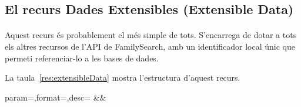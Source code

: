 \subsection{El recurs Dades Extensibles (Extensible Data)}

    \paragraph{}
    Aquest recurs és probablement el més simple de tots. S'encarrega de dotar a tots els altres recursos de l'API de FamilySearch, amb un identificador local únic que permeti referenciar-lo a les bases de dades.

    La taula~\ref{res:extensibleData} mostra l'estructura d'aquest recurs.

    \begin{center}
             {param=\param,format=\format,desc=\desc}
             {\param&\format&\desc}
     \end{center}
